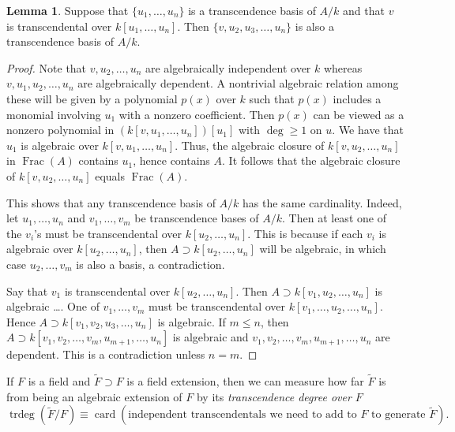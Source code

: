 \documentclass[10pt,letterpaper,cm]{nupset}
\theoremstyle{definition}
\theoremstyle{theorem}
\newtheorem{lemma}[definition]{Lemma}
\theoremstyle{remark}
\newcommand{\1}{\mathbf{1}}
\newcommand{\0}{\vec 0}
\DeclareMathOperator{\card}{\text{card}}
\DeclareMathOperator{\trdeg}{trdeg}
\DeclareMathOperator{\Frac}{Frac}
\begin{document}
\begin{lemma}
Suppose that $\{u_1, \ldots, u_n\}$ is a transcendence basis of $A/k$ and that $v$ is transcendental over $k[u_1, \ldots, u_n]$. Then $\{ v, u_2, u_3, \ldots, u_n \}$ is also a transcendence basis of $A/k$.
\end{lemma}
\begin{proof}
Note that $v, u_2, \ldots, u_n$ are algebraically independent over $k$ whereas $v, u_1, u_2, \ldots, u_n$ are algebraically dependent. A nontrivial algebraic relation among these will be given by a polynomial $p(x)$ over $k$ such that $p(x)$ includes a monomial involving $u_1$ with a nonzero coefficient. Then $p(x)$ can be viewed as a nonzero polynomial in $(k[v, u_1, \ldots, u_n])[u_1]$ with $\deg \geq 1$ on $u$. We have that $u_1$ is algebraic over $k[v, u_1, \ldots, u_n]$. Thus, the algebraic closure of $k[v, u_2, \ldots, u_n]$ in $\Frac(A)$ contains $u_1$, hence contains $A$. It follows that the algebraic closure of $k[v, u_2, \ldots, u_n]$ equals $\Frac(A)$.

\medskip


This shows that any transcendence basis of $A / k$ has the same cardinality. Indeed, let $u_1, \ldots, u_n$ and $v_1, \ldots, v_m$ be transcendence bases of $A/k$. Then at least one of the $v_i$'s must be transcendental over $k[u_2, \ldots, u_n]$. This is because if each $v_i$ is algebraic over $k[u_2, \ldots, u_n]$, then $A \supset k[u_2, \ldots, u_n]$ will be algebraic, in which case $u_2, \ldots, v_m$ is also a basis, a contradiction. 

\medskip


Say that $v_1$ is transcendental over $k[u_2, \ldots, u_n]$. Then $A \supset k[v_1, u_2, \ldots, u_n]$ is algebraic \ldots . One of $v_1, \ldots, v_m$ must be transcendental over $k[v_1, \ldots, u_2, \ldots, u_n]$. Hence $A \supset k[v_1, v_2, u_3, \ldots, u_n]$ is algebraic. If $m \leq n$, then $A \supset k[v_1, v_2, \ldots, v_m, u_{m+1}, \ldots, u_n]$ is algebraic and $v_1, v_2, \ldots, v_m, u_{m+1}, \ldots, u_n$ are dependent. This is a contradiction unless $n=m$. 
\end{proof}

\smallskip

If $F$ is a field and $\widetilde{F}\supset F$ is a field extension, then we can measure how far $\widetilde{F}$ is from being an algebraic extension of $F$ by its \textit{transcendence degree over $F$} $$\trdeg\left(\widetilde{F}/F\right) \equiv  \card(\text{independent transcendentals we need to add to } F \text{ to generate } \widetilde{F}).$$
\end{document}
